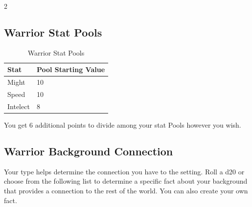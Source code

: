 \begin{multicols}{2}
\subsection{Warrior Stat Pools}

\begin{table}[H]
\centering
\caption{Warrior Stat Pools}
\label{tab: Warrior Stat Pools}

\begin{tabularx}{\linewidth}{| X | X |}
\hline
\textbf{Stat} & \textbf{Pool Starting Value} \\
\hline
Might & 10 \\ \hline
Speed & 10 \\ \hline
Intelect & 8  \\ \hline

\end{tabularx}

\end{table}

\raggedright

You get 6 additional points to divide among your stat Pools however you wish.

\subsection{Warrior Background Connection}

Your type helps determine the connection you have to the setting. Roll a d20 or choose from the following list to determine a specific fact about your background that provides a connection to the rest of the world. You can also create your own fact.

\begin{table}
\centering

\caption{Warrior Background Connection}
\label{tab:Warrior Background Connection}


\end{table}
\end{multicols}
